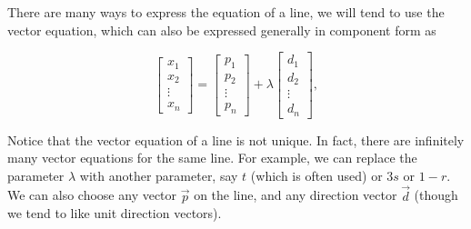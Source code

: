 \documentclass{ximera}
\begin{document}
There are many ways to express the equation of a line, we will tend to use the vector equation, which can also be expressed generally in component form as 

\begin{equation*}
  \begin{bmatrix} x_1 \\ x_2 \\ \vdots \\ x_n \end{bmatrix}
  = \begin{bmatrix} p_1 \\ p_2 \\ \vdots \\ p_n \end{bmatrix}
  + \lambda \begin{bmatrix} d_1 \\ d_2 \\ \vdots \\ d_n \end{bmatrix},
\end{equation*}

Notice that the vector equation of a line is not unique. In fact,
there are infinitely many vector equations for the same line. For
example, we can replace the parameter $\lambda$ with another parameter, say $t$ (which is often used) or 
$3s$ or $1-r$. We can also choose any vector $\vec{p}$ on the line, and any direction vector $\vec{d}$ (though we tend to like unit direction vectors).
\end{document}
